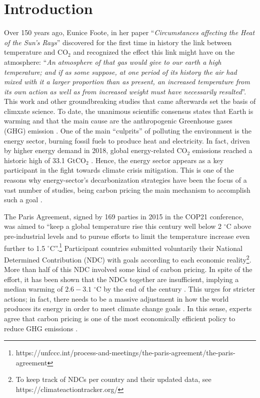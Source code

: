 \documentclass[11pt, letterpaper]{article}
\begin{document}
\section{Introduction}\label{sec:intro}
Over 150 years ago, Eunice Foote, in her paper ``\textit{Circumstances affecting the Heat of the Sun's Rays}'' \cite{Foote1856} discovered for the first time in history the link between temperature and CO$_2$ and recognized the effect this link might have on the atmosphere: ``\textit{An atmosphere of that gas would give to our earth a high temperature; and if as some suppose, at one period of its history the air had mixed with it a larger proportion than as present, an increased temperature from its own action as well as from increased weight must have necessarily resulted}''. This work and other groundbreaking studies that came afterwards set the basis of climxate science. To date, the unanimous scientific consensus states that Earth is warming and that the main cause are the anthropogenic Greenhouse gases (GHG) emission \cite{powell2019scientists}. One of the main ``culprits'' of polluting the environment is the energy sector, burning fossil fuels to produce heat and electricity. In fact, driven by higher energy demand in 2018, global energy-related CO$_2$ emissions reached a historic high of 33.1 GtCO$_2$ \cite{IEA2019}. Hence, the energy sector appears as a key participant in the fight towards climate crisis mitigation. This is one of the reasons why energy-sector's decarbonization strategies have been the focus of a vast number of studies, being carbon pricing the main mechanism to accomplish such a goal \cite{Robert2019Carbon}. 

\smallskip
The Paris Agreement, signed by 169 parties in 2015 in the COP21 conference, was aimed to ``keep a global temperature rise this century well below 2 $^{\circ}$C above pre-industrial levels and to pursue efforts to limit the temperature increase even further to 1.5 $^{\circ}$C''.\footnote{ https://unfccc.int/process-and-meetings/the-paris-agreement/the-paris-agreement} Participant countries submitted voluntarily their National Determined Contribution (NDC) with goals according to each economic reality\footnote{ To keep track of NDCs per country and their updated data, see https://climateactiontracker.org/ }. More than half of this NDC involved some kind of carbon pricing. In spite of the effort, it has been shown that the NDCs together are insufficient, implying a median warming of $2.6-3.1$ $^{\circ}$C by the end of the century \cite{rogelj2016paris}. This urges for stricter actions; in fact, there needs to be a massive adjustment in how the world produces its energy in order to meet climate change goals \cite{UNreport}. In this sense, experts agree that carbon pricing is one of the most economically efficient policy to reduce GHG emissions \cite{schmalensee2015lessons}.
\end{document}
